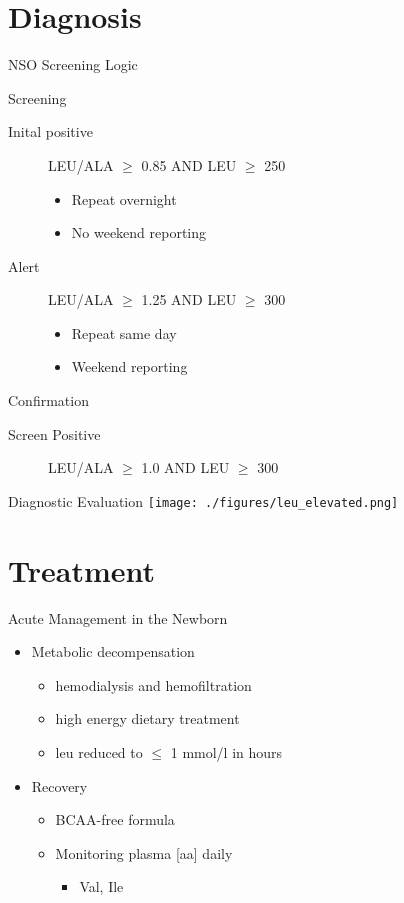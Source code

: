 \documentclass[presentation, smaller]{beamer}
\begin{document}
\section{Diagnosis}
\label{sec:orgheadline15}
\begin{frame}[label={sec:orgheadline13}]{NSO Screening Logic}
\begin{block}{Screening}
\begin{description}
\item[{Inital positive}] LEU/ALA \(\ge\) 0.85 AND LEU \(\ge\) 250
\begin{itemize}
\item Repeat overnight
\item No weekend reporting
\end{itemize}
\item[{Alert}] LEU/ALA \(\ge\) 1.25 AND LEU \(\ge\) 300
\begin{itemize}
\item Repeat same day
\item Weekend reporting
\end{itemize}
\end{description}
\end{block}

\begin{block}{Confirmation}
\begin{description}
\item[{Screen Positive}] LEU/ALA \(\ge\) 1.0 AND LEU \(\ge\) 300
\end{description}
\end{block}
\end{frame}

\begin{frame}[label={sec:orgheadline14}]{Diagnostic Evaluation}
\texttt{[image: ./figures/leu\_elevated.png]}
\end{frame}

\section{Treatment}
\label{sec:orgheadline19}
\begin{frame}[label={sec:orgheadline16}]{Acute Management in the Newborn}
\begin{itemize}
\item Metabolic decompensation
\begin{itemize}
\item hemodialysis and hemofiltration
\item high energy dietary treatment
\item leu reduced to \(\le\) 1 mmol/l in hours
\end{itemize}
\item Recovery
\begin{itemize}
\item BCAA-free formula
\item Monitoring plasma [aa] daily
\begin{itemize}
\item Val, Ile
\end{itemize}
\end{itemize}
\end{itemize}
\end{frame}
\end{document}
